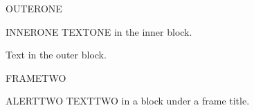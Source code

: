 \documentclass[a4paper]{memoir}
\begin{document}
\begin{frame}
  \begin{block}{OUTERONE}
    \begin{block}{INNERONE}
      TEXTONE in the inner block.
    \end{block}
    Text in the outer block.
  \end{block}
\end{frame}
\begin{frame}{FRAMETWO}
  \begin{alertblock}{ALERTTWO}
    TEXTTWO in a block under a frame title.
  \end{alertblock}
\end{frame}
\end{document}
